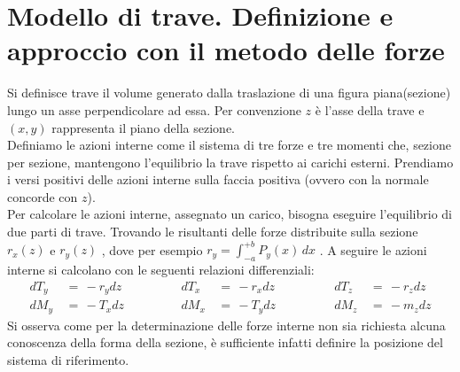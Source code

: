 \section{Modello di trave. Definizione e approccio con il metodo delle forze}

Si definisce trave il volume generato dalla traslazione di una figura piana(sezione) lungo un asse perpendicolare ad essa. Per convenzione $z$ è l'asse della trave e $(x,y)$ rappresenta il piano della sezione.\\
Definiamo le azioni interne come il sistema di tre forze e tre momenti che, sezione per sezione, mantengono l'equilibrio la trave rispetto ai carichi esterni. Prendiamo i versi positivi delle azioni interne sulla faccia positiva (ovvero con la normale concorde con $z$).\\
Per calcolare le azioni interne, assegnato un carico, bisogna eseguire l'equilibrio di due parti di trave. Trovando le risultanti delle forze distribuite sulla sezione $r_x(z)$ e $r_y(z)$ , dove per esempio $r_y = \int_{-a}^{+b}P_y(x)\,dx$ . A seguire le azioni interne si calcolano con le seguenti relazioni differenziali:
\begin{align*}
    dT_y \, &=\, -r_ydz \quad \quad \quad\quad &dT_x \, &=\, -r_xdz \quad \quad \quad\quad &dT_z \, &=\, -r_zdz \\
    dM_y \, &=\, -T_xdz      &dM_x \, &=\, -T_ydz       &dM_z \, &=\, -m_zdz 
\end{align*}
Si osserva come per la determinazione delle forze interne non sia richiesta alcuna conoscenza della forma della sezione, è sufficiente infatti definire la posizione del sistema di riferimento.\\

